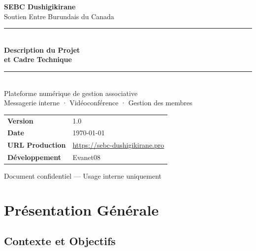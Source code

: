 \documentclass[12pt,a4paper]{article}
\begin{document}
\begin{titlepage}
\begin{center}
\vspace*{2cm}

{\Huge\bfseries\color{sebcblue} SEBC Dushigikirane}\\[0.5cm]
{\Large\color{sebcblulight} Soutien Entre Burundais du Canada}\\[2cm]

\rule{\textwidth}{2pt}\\[0.8cm]
{\LARGE\bfseries Description du Projet\\et Cadre Technique}\\[0.5cm]
\rule{\textwidth}{2pt}\\[2cm]

{\large\color{sebcgray}
Plateforme numérique de gestion associative\\
Messagerie interne · Vidéoconférence · Gestion des membres\\[1cm]
}

\begin{tabular}{ll}
\textbf{Version} & 1.0 \\
\textbf{Date} & \today \\
\textbf{URL Production} & \url{https://sebc-dushigikirane.pro} \\
\textbf{Développement} & Evanet08 \\
\end{tabular}

\vfill
{\small\color{sebcgray} Document confidentiel — Usage interne uniquement}
\end{center}
\end{titlepage}

\tableofcontents
\newpage

\section{Présentation Générale}

\subsection{Contexte et Objectifs}
\end{document}
